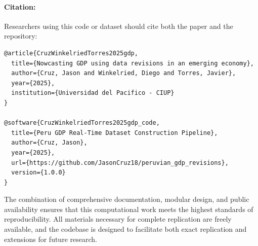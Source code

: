 \documentclass[a4paper, fleqn, 11pt]{article}
\begin{document}
\paragraph{Citation:} Researchers using this code or dataset should cite both the paper and the repository:

\begin{lstlisting}[language=tex, caption={Suggested citation}]
@article{CruzWinkelriedTorres2025gdp,
  title={Nowcasting GDP using data revisions in an emerging economy},
  author={Cruz, Jason and Winkelried, Diego and Torres, Javier},
  year={2025},
  institution={Universidad del Pacifico - CIUP}
}

@software{CruzWinkelriedTorres2025gdp_code,
  title={Peru GDP Real-Time Dataset Construction Pipeline},
  author={Cruz, Jason},
  year={2025},
  url={https://github.com/JasonCruz18/peruvian_gdp_revisions},
  version={1.0.0}
}
\end{lstlisting}

The combination of comprehensive documentation, modular design, and public availability ensures that this computational work meets the highest standards of reproducibility. All materials necessary for complete replication are freely available, and the codebase is designed to facilitate both exact replication and extensions for future research.
\end{document}
